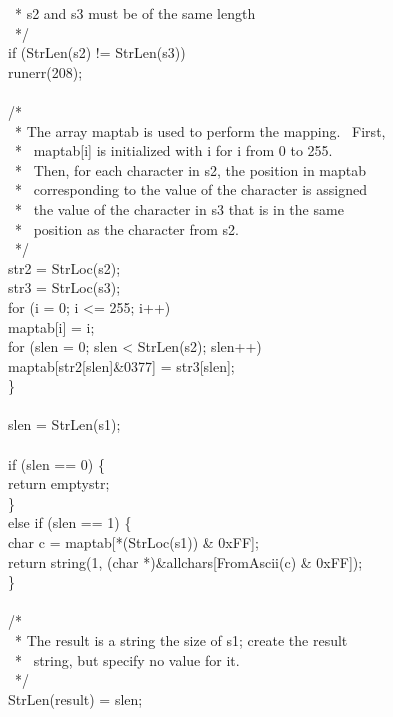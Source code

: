 {\>\>\>\ * s2 and s3 must be of the same length\\
\>\>\>\ */\\
\>\>\>if (StrLen(s2) != StrLen(s3))\\
\>\>\>\>runerr(208);\\
\\
\>\>\>/*\\
\>\>\>\ * The array maptab is used to perform the mapping. \ First,\\
\>\>\>\ * \ maptab[i] is initialized with i for i from 0 to 255.\\
\>\>\>\ * \ Then, for each character in s2, the position in maptab\\
\>\>\>\ * \ corresponding to the value of the character is assigned\\
\>\>\>\ * \ the value of the character in s3 that is in the same\\
\>\>\>\ * \ position as the character from s2.\\
\>\>\>\ */\\
\>\>\>str2 = StrLoc(s2);\\
\>\>\>str3 = StrLoc(s3);\\
\>\>\>for (i = 0; i <= 255; i++)\\
\>\>\>\>maptab[i] = i;\\
\>\>\>for (slen = 0; slen < StrLen(s2); slen++)\\
\>\>\>\>maptab[str2[slen]\&0377] = str3[slen];\\
\>\>\>\}\\
\\
\>\>\>slen = StrLen(s1);\\
\\
\>\>\>if (slen == 0) \{\\
\>\>\>\>return emptystr;\\
\>\>\>\}\\
\>\>\>else if (slen == 1) \{\\
\>\>\>\>char c = maptab[*(StrLoc(s1)) \& 0xFF];\\
\>\>\>\>return string(1, (char *)\&allchars[FromAscii(c) \& 0xFF]);\\
\>\>\>\}\\
\\
\>\>\>/*\\
\>\>\>\ * The result is a string the size of s1; create the result\\
\>\>\>\ * \ string, but specify no value for it.\\
\>\>\>\ */\\
\>\>\>StrLen(result) = slen;\\
}
